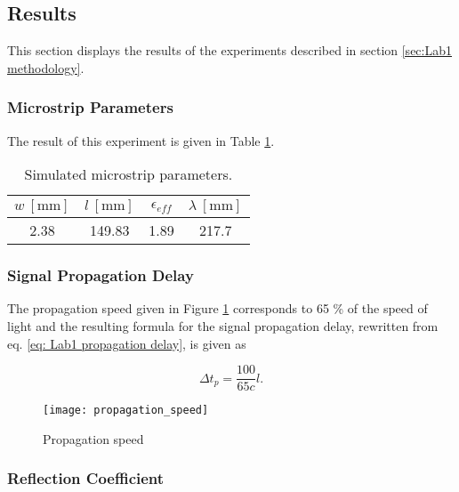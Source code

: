 \documentclass[report.tex]{subfiles}
\begin{document}
\subsection{Results}
This section displays the results of the experiments described in section \ref{sec:Lab1 methodology}.

\subsubsection{Microstrip Parameters}
The result of this experiment is given in Table \ref{table: Lab1 Simulated Microstrip parameters}.

\begin{table}[h]
    \centering
    \caption{Simulated microstrip parameters.\label{table: Lab1 Simulated Microstrip parameters}}
    \begin{tabular}{c | c | c | c}
        $w\: [\text{mm}]$ & $l\: [\text{mm}]$ & $\epsilon_{eff}$ & $\lambda\: [\text{mm}]$\\
        \hline
		2.38 & 149.83 & 1.89 & 217.7
    \end{tabular}
\end{table}

\subsubsection{Signal Propagation Delay}\label{subsubsec:Lab 1 Signal propagation delay}

The propagation speed given in Figure \ref{fig:Lab1 propagation speed} corresponds to 65 \% of the speed of light and the resulting formula for the signal propagation delay, rewritten from eq. \ref{eq: Lab1 propagation delay}, is given as

\begin{equation}
	\Delta t_p = \dfrac{100}{65 c}l.
\end{equation}

\vspace*{\fill}

\begin{figure}[h]
    \centering
	\texttt{[image: propagation\_speed]}
	\caption{Propagation speed}
	\label{fig:Lab1 propagation speed}
\end{figure}

\vspace*{\fill}

\clearpage

\subsubsection{Reflection Coefficient}\label{subsubsec:Lab1 ref coeff}
\end{document}
